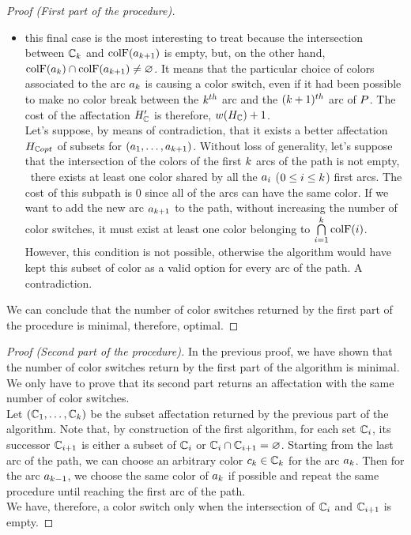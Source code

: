 \begin{proof}[Proof (First part of the procedure)]
\begin{itemize}
\begin{itemize}
            \item this final case is the most interesting to treat because the intersection between $\mathbb{C}_{k}$ and $\text{colF}(a_{k+1})$ is empty, but, on the other hand, $\text{colF}(a_{k}) \cap \text{colF}(a_{k+1}) \neq \varnothing$. It means that the particular choice of colors associated to the arc $a_k$ is causing a color switch, even if it had been possible to make no color break between the $k^{th}$ arc and the  $(k+1)^{th}$ arc of $P$. The cost of the affectation $H_{\mathbb{C}}'$ is therefore, $w(H_{\mathbb{C}}) + 1$.\\
                  Let's suppose, by means of contradiction, that it exists a better affectation $H_{\mathbb{C} opt}$ of subsets for $(a_1,\ldots,a_{k + 1})$. Without loss of generality, let's suppose that the intersection of the colors of the first $k$ arcs of the path is not empty, \ie\ there exists at least one color shared by all the $a_i$ ($0 \leq i \leq k$) first arcs. The cost of this subpath is $0$ since all of the arcs can have the same color. If we want to add the new arc $a_{k + 1}$ to the path, without increasing the number of color switches, it must exist at least one color belonging to $\bigcap\limits_{i = 1}^k \text{colF}(i)$. However, this condition is not possible, otherwise the algorithm would have kept this subset of color as a valid option for every arc of the path. A contradiction.
          \end{itemize}
  \end{itemize}
  We can conclude that the number of color switches returned by the first part of the procedure is minimal, therefore, optimal.
\end{proof}

\begin{proof}[Proof (Second part of the procedure)]
  In the previous proof, we have shown that the number of color switches return by the first part of the algorithm is minimal. We only have to prove that its second part returns an affectation with the same number of color switches.\\
  Let $(\mathbb{C}_1,\ldots,\mathbb{C}_{k})$ be the subset affectation returned by the previous part of the algorithm. Note that, by construction of the first algorithm, for each set $\mathbb{C}_i$, its successor $\mathbb{C}_{i+1}$ is either a subset of $\mathbb{C}_i$ or $\mathbb{C}_i \cap \mathbb{C}_{i+1} = \varnothing$.
  Starting from the last arc of the path, we can choose an arbitrary color $c_k \in \mathbb{C}_k$ for the arc $a_k$. Then for the arc $a_{k-1}$, we choose the same color of $a_k$ if possible and repeat the same procedure until reaching the first arc of the path.\\
  We have, therefore, a color switch only when the intersection of $\mathbb{C}_i$ and $\mathbb{C}_{i+1}$ is empty.
\end{proof}

